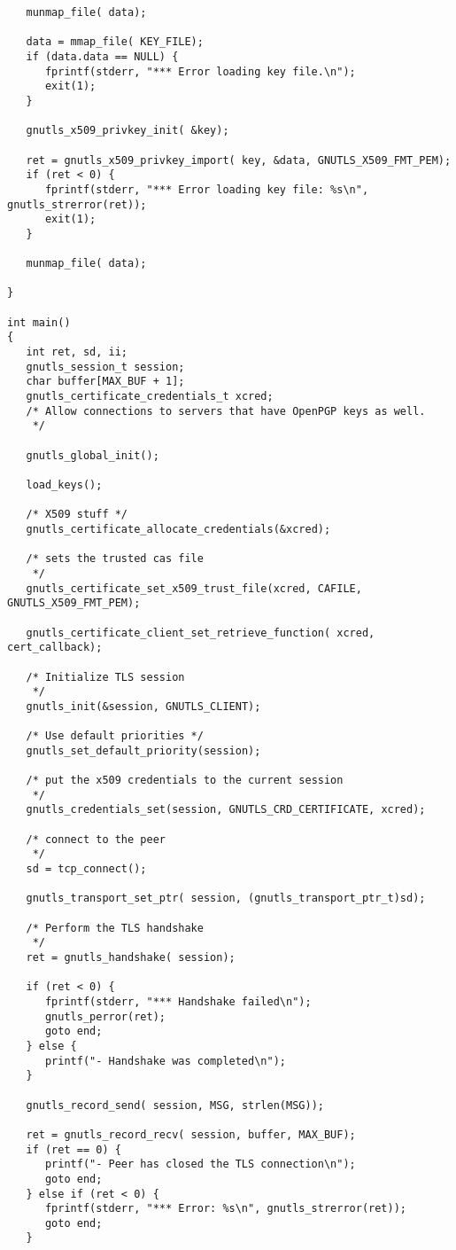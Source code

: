 \begin{verbatim}
   munmap_file( data);

   data = mmap_file( KEY_FILE);
   if (data.data == NULL) {
      fprintf(stderr, "*** Error loading key file.\n");
      exit(1);
   }

   gnutls_x509_privkey_init( &key);
   
   ret = gnutls_x509_privkey_import( key, &data, GNUTLS_X509_FMT_PEM);
   if (ret < 0) {
      fprintf(stderr, "*** Error loading key file: %s\n", gnutls_strerror(ret));
      exit(1);
   }

   munmap_file( data);
   
}

int main()
{
   int ret, sd, ii;
   gnutls_session_t session;
   char buffer[MAX_BUF + 1];
   gnutls_certificate_credentials_t xcred;
   /* Allow connections to servers that have OpenPGP keys as well.
    */

   gnutls_global_init();

   load_keys();

   /* X509 stuff */
   gnutls_certificate_allocate_credentials(&xcred);

   /* sets the trusted cas file
    */
   gnutls_certificate_set_x509_trust_file(xcred, CAFILE, GNUTLS_X509_FMT_PEM);

   gnutls_certificate_client_set_retrieve_function( xcred, cert_callback);
   
   /* Initialize TLS session 
    */
   gnutls_init(&session, GNUTLS_CLIENT);

   /* Use default priorities */
   gnutls_set_default_priority(session);

   /* put the x509 credentials to the current session
    */
   gnutls_credentials_set(session, GNUTLS_CRD_CERTIFICATE, xcred);

   /* connect to the peer
    */
   sd = tcp_connect();

   gnutls_transport_set_ptr( session, (gnutls_transport_ptr_t)sd);

   /* Perform the TLS handshake
    */
   ret = gnutls_handshake( session);

   if (ret < 0) {
      fprintf(stderr, "*** Handshake failed\n");
      gnutls_perror(ret);
      goto end;
   } else {
      printf("- Handshake was completed\n");
   }

   gnutls_record_send( session, MSG, strlen(MSG));

   ret = gnutls_record_recv( session, buffer, MAX_BUF);
   if (ret == 0) {
      printf("- Peer has closed the TLS connection\n");
      goto end;
   } else if (ret < 0) {
      fprintf(stderr, "*** Error: %s\n", gnutls_strerror(ret));
      goto end;
   }


\end{verbatim}
